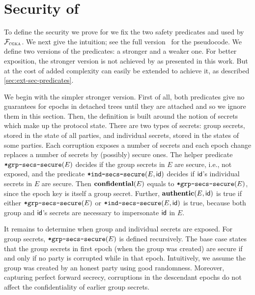 
\section{Security of \saik}\label{sec:saik-sec-int}
To define the security we prove for \saik we fix the two safety
predicates \KwConf{} and \KwAuth{} used by $\mathcal{F}_{\normalfont\textsc{cgka}}$. We next give the intuition; see the full version~\cite{EPRINT:AHKM21} for the pseudocode. We define two versions of the
predicates: a stronger and a weaker one. For better exposition, the
stronger version is not achieved by \saik as presented in this work. But at the cost of added complexity
\saik can easily be extended to achieve it, as
described \cref{sec:ext-sec-predicates}.

We begin with the simpler stronger version. First of all, both predicates give no
guarantees for epochs in detached trees until they are attached and so we
ignore them in this section. Then, the definition is built around the notion of
secrets which make up the protocol state. There are two types of secrets:
group secrets, stored in the state of all parties, and individual secrets,
stored in the states of some parties. Each corruption exposes a number of
secrets and each epoch change replaces a number of secrets by (possibly)
secure ones. The helper predicate ${\textnormal{\tt*grp-secs-secure}}{}(E)$ decides
if the group secrets in $E$ are secure, i.e., not exposed, and the
predicate ${\textnormal{\tt*ind-secs-secure}}(E, {\mathsf{id}})$ decides if ${\mathsf{id}}$'s individual
secrets in $E$ are secure.
%
Then $\textnormal{\textbf{confidential}}{}(E)$ equals to
${\textnormal{\tt*grp-secs-secure}}{}(E)$, since the epoch key is itself a group
secret. Further, $\textnormal{\textbf{authentic}}{}(E, {\mathsf{id}})$ is true if either
${\textnormal{\tt*grp-secs-secure}}{}(E)$ or
${\textnormal{\tt*ind-secs-secure}}(E,{\mathsf{id}})$ is true, because both group and ${\mathsf{id}}$'s secrets
are necessary to impersonate ${\mathsf{id}}$ in $E$.

It remains to determine when group and individual secrets are exposed. For
group secrets, ${\textnormal{\tt*grp-secs-secure}}(E)$ is defined recursively. The
base case states that the group secrets in first epoch (when the group was
created) are secure if and only if no party is corrupted while in that epoch.
Intuitively, we assume the group was created by an honest party using good
randomness. Moreover, capturing perfect forward secrecy, corruptions in the
descendant epochs do not affect the confidentiality of earlier group secrets.

